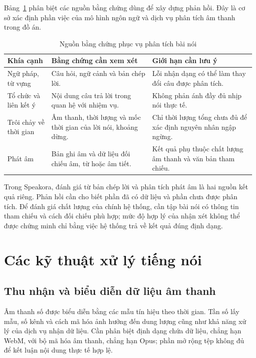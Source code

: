 \documentclass[12pt,a4paper,oneside]{report}
\begin{document}
Bảng~\ref{tab:bang-chung-danh-gia} phân biệt các nguồn bằng chứng dùng để xây dựng phản hồi. Đây là cơ sở xác định phần việc của mô hình ngôn ngữ và dịch vụ phân tích âm thanh trong đồ án.

\begin{table}[htbp]
    \centering
    \small
    \begin{tabularx}{\linewidth}{@{}p{2.8cm}XX@{}}
        \toprule
        \textbf{Khía cạnh} & \textbf{Bằng chứng cần xem xét} & \textbf{Giới hạn cần lưu ý} \\
        \midrule
        Ngữ pháp, từ vựng & Câu hỏi, ngữ cảnh và bản chép lời. & Lỗi nhận dạng có thể làm thay đổi câu được phân tích. \\
        \addlinespace
        Tổ chức và liên kết ý & Nội dung câu trả lời trong quan hệ với nhiệm vụ. & Không phản ánh đầy đủ nhịp nói thực tế. \\
        \addlinespace
        Trôi chảy về thời gian & Âm thanh, thời lượng và mốc thời gian của lời nói, khoảng dừng. & Chỉ thời lượng tổng chưa đủ để xác định nguyên nhân ngập ngừng. \\
        \addlinespace
        Phát âm & Bản ghi âm và dữ liệu đối chiếu âm, từ hoặc âm tiết. & Kết quả phụ thuộc chất lượng âm thanh và văn bản tham chiếu. \\
        \bottomrule
    \end{tabularx}
    \caption{Nguồn bằng chứng phục vụ phân tích bài nói}
    \label{tab:bang-chung-danh-gia}
\end{table}

Trong Speakora, đánh giá từ bản chép lời và phân tích phát âm là hai nguồn kết quả riêng. Phản hồi cần cho biết phần đã có dữ liệu và phần chưa được phân tích. Để đánh giá chất lượng của chính hệ thống, cần tập bài nói có thông tin tham chiếu và cách đối chiếu phù hợp; mức độ hợp lý của nhận xét không thể được chứng minh chỉ bằng việc hệ thống trả về kết quả đúng định dạng.

\section{Các kỹ thuật xử lý tiếng nói}

\subsection{Thu nhận và biểu diễn dữ liệu âm thanh}

Âm thanh số được biểu diễn bằng các mẫu tín hiệu theo thời gian. Tần số lấy mẫu, số kênh và cách mã hóa ảnh hưởng đến dung lượng cũng như khả năng xử lý của dịch vụ nhận dữ liệu. Cần phân biệt định dạng chứa dữ liệu, chẳng hạn WebM, với bộ mã hóa âm thanh, chẳng hạn Opus; phần mở rộng tệp không đủ để kết luận nội dung thực tế hợp lệ.
\end{document}
